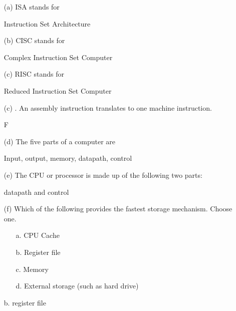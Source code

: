 \newpage
\nextq
\begin{itemize}

\item[(a)]
  ISA stands for
  
  \ANSWER\vspace{4mm}
  \begin{answercode}
  Instruction Set Architecture
  \end{answercode}

\item[(b)]
  CISC stands for
  \\
  \ANSWER\vspace{4mm}
  \begin{answercode}
  Complex Instruction Set Computer
  \end{answercode}

\item[(c)]
  RISC stands for
  \\
  \ANSWER\vspace{4mm}
  \begin{answercode}
  Reduced Instruction Set Computer
  \end{answercode}
  
\item[(c)]
  \tf.
  An assembly instruction translates to one machine instruction.
  \\
  \ANSWER\vspace{4mm}
  \begin{answercode}
  F
  \end{answercode}
  
\item[(d)]
  The five parts of a computer are
  \\
  \ANSWER\vspace{4mm}
  \begin{answercode}
  Input, output, memory, datapath, control 
  \end{answercode}

  
\item[(e)]
  The CPU or processor is made up of the following two parts:
  \\
  \ANSWER\vspace{4mm}
  \begin{answercode}
  datapath and control
  \end{answercode}
  
\item[(f)]
  Which of the following provides the fastest
  storage mechanism. Choose one.
  \begin{itemize}
  \item[a.] CPU Cache
  \item[b.] Register file
  \item[c.] Memory
  \item[d.] External storage (such as hard drive)
  \end{itemize}
  \ANSWER\vspace{4mm}
  \begin{answercode}
  b. register file
  \end{answercode}
\end{itemize}

